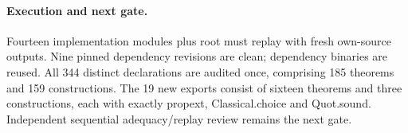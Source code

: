 \documentclass{article}
\begin{document}
\paragraph{Execution and next gate.} Fourteen implementation modules plus root must replay with fresh own-source outputs. Nine pinned dependency revisions are clean; dependency binaries are reused. All 344 distinct declarations are audited once, comprising 185 theorems and 159 constructions. The 19 new exports consist of sixteen theorems and three constructions, each with exactly propext, Classical.choice and Quot.sound. Independent sequential adequacy/replay review remains the next gate.
\end{document}
